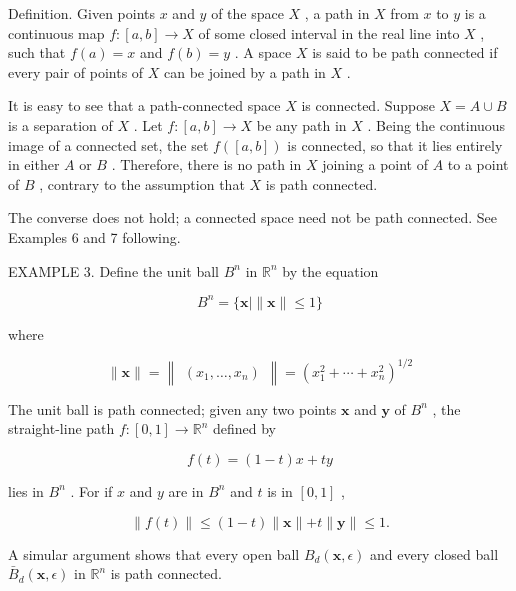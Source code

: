 \documentclass[10pt]{article}
\begin{document}
Definition. Given points \(x\) and \(y\) of the space \(X\) , a path in \(X\) from \(x\) to \(y\) is a continuous map \(f : \left\lbrack  {a,b}\right\rbrack   \rightarrow  X\) of some closed interval in the real line into \(X\) , such that \(f\left( a\right)  = x\) and \(f\left( b\right)  = y\) . A space \(X\) is said to be path connected if every pair of points of \(X\) can be joined by a path in \(X\) .

It is easy to see that a path-connected space \(X\) is connected. Suppose \(X = A \cup  B\) is a separation of \(X\) . Let \(f : \left\lbrack  {a,b}\right\rbrack   \rightarrow  X\) be any path in \(X\) . Being the continuous image of a connected set, the set \(f\left( \left\lbrack  {a,b}\right\rbrack  \right)\) is connected, so that it lies entirely in either \(A\) or \(B\) . Therefore, there is no path in \(X\) joining a point of \(A\) to a point of \(B\) , contrary to the assumption that \(X\) is path connected.

The converse does not hold; a connected space need not be path connected. See Examples 6 and 7 following.

EXAMPLE 3. Define the unit ball \({B}^{n}\) in \({\mathbb{R}}^{n}\) by the equation

\[
{B}^{n} = \{ \mathbf{x} \mid  \parallel \mathbf{x}\parallel  \leq  1\}
\]

where

\[
\parallel \mathbf{x}\parallel  = \begin{Vmatrix}\left( {{x}_{1},\ldots ,{x}_{n}}\right) \end{Vmatrix} = {\left( {x}_{1}^{2} + \cdots  + {x}_{n}^{2}\right) }^{1/2}
\]

The unit ball is path connected; given any two points \(\mathbf{x}\) and \(\mathbf{y}\) of \({B}^{n}\) , the straight-line path \(f : \left\lbrack  {0,1}\right\rbrack   \rightarrow  {\mathbb{R}}^{n}\) defined by

\[
f\left( t\right)  = \left( {1 - t}\right) x + {ty}
\]

lies in \({B}^{n}\) . For if \(x\) and \(y\) are in \({B}^{n}\) and \(t\) is in \(\left\lbrack  {0,1}\right\rbrack\) ,

\[
\parallel f\left( t\right) \parallel  \leq  \left( {1 - t}\right) \parallel \mathbf{x}\parallel  + t\parallel \mathbf{y}\parallel  \leq  1.
\]

A simular argument shows that every open ball \({B}_{d}\left( {\mathbf{x},\epsilon }\right)\) and every closed ball \({\bar{B}}_{d}\left( {\mathbf{x},\epsilon }\right)\) in \({\mathbb{R}}^{n}\) is path connected.
\end{document}
